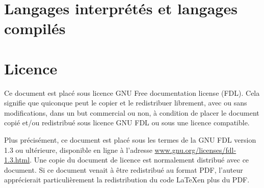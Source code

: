\documentclass{article}
\begin{document}
\section{Langages interprétés et langages compilés}


\printbibliography[title={Bibliographie}]

\section*{Licence}
Ce document est placé sous licence GNU Free documentation license (FDL).
Cela signifie que quiconque peut le copier et le redistribuer librement, avec ou
sans modifications, dans un but commercial ou non, à condition de placer le
document copié et/ou redistribué sous licence GNU FDL ou sous une licence
compatible.

Plus précisément, ce document est placé sous les termes de la GNU FDL version 1.3 ou
ultérieure, disponible en ligne à l’adresse
\href{www.gnu.org/licenses/fdl-1.3.html}{www.gnu.org/licenses/fdl-1.3.html}.
Une copie du document de licence est normalement distribué avec ce document.
Si ce document venait à être redistribué au format PDF, l’auteur apprécierait
particulièrement la redistribution du code \LaTeX\nobreakspace en plus du PDF.
\end{document}
